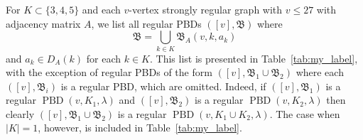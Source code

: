 \documentclass[11pt]{article}
\begin{document}
For $K\subset \{3,4,5\}$ and each $v$-vertex strongly regular graph with $v\leqslant 27$ with adjacency matrix $A$, we list all regular PBDs $([v], \mathfrak B)$ where 
\[
\mathfrak B = \bigcup_{k\in K}\mathfrak B_A(v,k,a_k)
\]
and $a_k\in D_A(k)$ for each $k \in K$.
This list is presented in Table~\ref{tab:my_label}, with the exception of regular PBDs of the form $([v],\mathfrak B_1\cup \mathfrak B_2)$ where each $([v],\mathfrak B_i)$ is a regular PBD, which are omitted. 
Indeed, if $([v],\mathfrak B_1)$ is a regular $\operatorname{PBD}(v,K_1,\lambda)$ and $([v],\mathfrak B_2)$ is a regular $\operatorname{PBD}(v,K_2,\lambda)$ then clearly $([v],\mathfrak B_1\cup \mathfrak B_2)$ is a regular $\operatorname{PBD}(v,K_1 \cup K_2,\lambda)$.
The case when $|K|=1$, however, is included in Table~\ref{tab:my_label}. 
\end{document}

